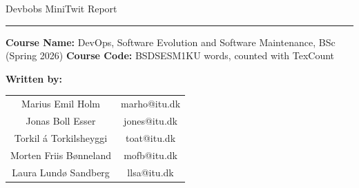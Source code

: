 \begin{center}
    {\huge Devbobs MiniTwit Report}
    \hrule
    \vspace{0.5cm}

    {\large \textbf{Course Name:} DevOps, Software Evolution and Software Maintenance, BSc (Spring 2026)}\vspace{0.1cm} \newline
    {\large \textbf{Course Code:}  BSDSESM1KU}  words, counted with TexCount \vspace{2cm}  \newline
\end{center}
\begin{center}
    \begin{large}
    \textbf{Written by:} \newline
    \end{large}
    \hspace*{-1cm}
    \begin{tabular}{c c}
        Marius Emil Holm & marho@itu.dk\\
        Jonas Boll Esser & jones@itu.dk\\ 
        Torkil á Torkilsheyggi & toat@itu.dk \\
        Morten Friis Bønneland & mofb@itu.dk \\
        Laura Lundø Sandberg   & llsa@itu.dk \\  
    \end{tabular}    
\end{center}
